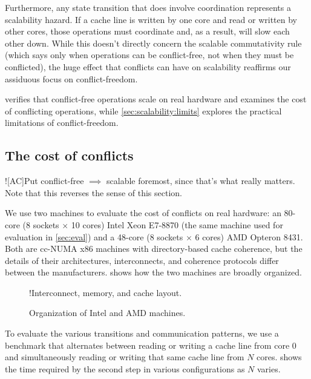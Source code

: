 Furthermore, any state transition that does involve coordination
represents a scalability hazard.  If a cache line is written by one
core and read or written by other cores, those operations must
coordinate and, as a result, will slow each other down.  While this
doesn't directly concern the scalable commutativity rule (which says
only when operations can be conflict-free, not when they must be
conflicted), the huge effect that conflicts can have on scalability
reaffirms our assiduous focus on conflict-freedom.

 verifies that conflict-free
operations scale on real hardware and examines the cost of conflicting
operations, while \cref{sec:scalability:limits} explores the practical
limitations of conflict-freedom.


\subsection{The cost of conflicts}
\label{sec:scalability:conflict-free}

\XXX![AC]{Put conflict-free $\implies$ scalable foremost, since that's
  what really matters.  Note that this reverses the sense of this
  section.}

We use two machines to evaluate the cost of conflicts on real
hardware: an 80-core (8 sockets $\times$ 10 cores) Intel Xeon E7-8870
(the same machine used for evaluation in \cref{sec:eval}) and a
48-core (8 sockets $\times$ 6 cores) AMD Opteron 8431.  Both are
cc-NUMA x86 machines with directory-based cache coherence, but the
details of their architectures, interconnects, and coherence protocols
differ between the manufacturers.   shows how the
two machines are broadly organized.

\begin{figure}
  \centering
  \XXX!{Interconnect, memory, and cache layout.}
  \caption{Organization of Intel and AMD machines.}
  \label{fig:machines}
\end{figure}

To evaluate the various transitions and communication patterns, we use
a benchmark that alternates between reading or writing a cache line
from core 0 and simultaneously reading or writing that same cache line
from $N$ cores.   shows the time required by
the second step in various configurations as $N$ varies.

\begin{figure}
  \centering
  
  \label{fig:sharing-cycles}
\end{figure}

